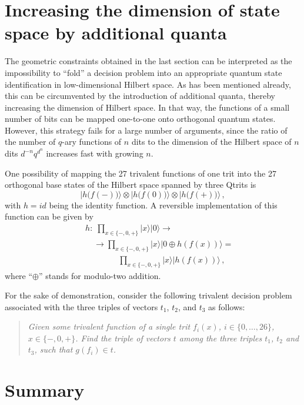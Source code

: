 \documentclass[fleqn,twoside]{article}
\begin{document}
\section{Increasing the dimension of state space by additional quanta}

The geometric constraints obtained in the last section can be interpreted
as the impossibility to ``fold'' a decision problem
into an appropriate quantum state identification in low-dimensional Hilbert space.
As has been mentioned already, this can be circumvented by the introduction of additional quanta,
thereby increasing the dimension of Hilbert space.
In that way, the functions of a small number of bits can be mapped one-to-one onto orthogonal quantum states.
However, this strategy fails for a large number of arguments, since the ratio
of the number of $q$-ary functions of $n$ dits to the dimension of the Hilbert space of $n$ dits
$d^{-n} q^{d^n}$ increases fast with growing $n$.

One possibility of mapping the 27 trivalent functions of one trit into the 27 orthogonal base states of the Hilbert space spanned by three Qtrits
is
$$|h\bigl(f(-)\bigr)\rangle \otimes
    |h\bigl(f(0)\bigr)\rangle \otimes
    |h\bigl(f(+)\bigr)\rangle\,,$$
with $h= id$ being the identity function.
A reversible implementation of this function can be given by
$$
\begin{array}{lll}
&&h:\; \prod_{x \in \{-,0,+\}} \vert x\rangle |0\rangle  \rightarrow
\\
&&
\quad \rightarrow
\prod_{x \in \{-,0,+\}} \vert x\rangle |0\oplus h(f(x))\rangle =  \\
&&
\qquad \qquad \prod_{x \in \{-,0,+\}} \vert x\rangle |h(f(x))\rangle
\,
,
\end{array}
$$
where ``$\oplus$'' stands for modulo-two addition.

For the sake of demonstration, consider the following trivalent decision problem associated with the three triples of vectors
$t_1$,
$t_2$, and
$t_3$ as follows:
\begin{quote}
{\em
Given some trivalent function of a single trit $f_i (x)$, $i\in \{0,\ldots ,26\}$, $x\in \{-,0,+\}$.
Find the triple of vectors $t$ among the three triples
$t_1$,
$t_2$ and
$t_3$, such that
$g(f_i)\in t$.
}
\end{quote}


\section{Summary}
\end{document}
